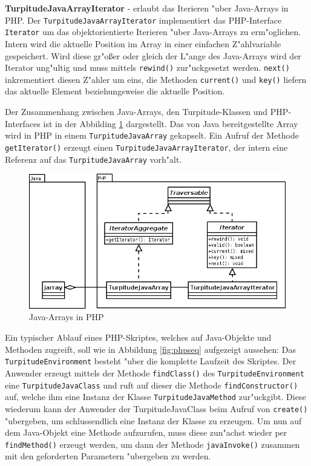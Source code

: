 \textbf{TurpitudeJavaArrayIterator} - erlaubt das Iterieren "uber Java-Arrays in PHP. Der \texttt{TurpitudeJavaArrayIterator} implementiert
das PHP-Interface \texttt{Iterator} um das objektorientierte Iterieren "uber Java-Arrays zu erm"oglichen. Intern wird die aktuelle
Position im Array in einer einfachen Z"ahlvariable gespeichert. Wird diese gr"o\ss er oder gleich der L"ange des Java-Arrays wird der
Iterator ung"ultig und muss mittels \texttt{rewind()} zur"uckgesetzt werden. \texttt{next()} inkrementiert diesen Z"ahler um eins, die Methoden
\texttt{current()} und \texttt{key()} liefern das aktuelle Element beziehungsweise die aktuelle Position.

Der Zusammenhang zwischen Java-Arrays, den Turpitude-Klassen und PHP-Interfaces ist in der Abbilding \ref{fig:javaarrays} dargestellt.
Das von Java bereitgestellte Array wird in PHP in einem \texttt{TurpitudeJavaArray} gekapselt. Ein Aufruf der Methode
\texttt{getIterator()} erzeugt einen \texttt{TurpitudeJavaArrayIterator}, der intern eine Referenz auf das \texttt{TurpitudeJavaArray}
vorh"alt. 

\begin{figure}[h]
\includegraphics[width=\textwidth]{chap1/img/javaarrays.png}
\caption{Java-Arrays in PHP}
\label{fig:javaarrays}
\end{figure}

Ein typischer Ablauf eines PHP-Skriptes, welches auf Java-Objekte und Methoden zugreift, soll wie in Abbildung \ref{fig:phpseq} aufgezeigt 
aussehen:
Das \texttt{TurpitudeEnvironment} besteht "uber die komplette Laufzeit des Skriptes. Der Anwender erzeugt mittels der Methode \texttt{findClass()} 
des \texttt{TurpitudeEnvironment} eine \texttt{TurpitudeJavaClass} und ruft auf dieser die Methode \texttt{findConstructor()} auf, welche ihm 
eine Instanz der Klasse \texttt{TurpitudeJavaMethod} zur"uckgibt. Diese wiederum 
kann der Anwender der TurpitudeJavaClass beim Aufruf von \texttt{create()} "ubergeben, um schlussendlich eine Instanz der Klasse zu erzeugen.
Um nun auf dem Java-Objekt eine Methode aufzurufen, muss diese zun"achst wieder per \texttt{findMethod()} erzeugt werden, um dann der
Methode \texttt{javaInvoke()} zusammen mit den geforderten Parametern "ubergeben zu werden.

